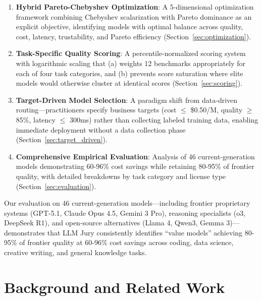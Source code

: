 \documentclass[11pt,a4paper]{article}
\begin{document}
\begin{enumerate}
    \item \textbf{Hybrid Pareto-Chebyshev Optimization}: A 5-dimensional optimization framework combining Chebyshev scalarization with Pareto dominance as an explicit objective, identifying models with optimal balance across quality, cost, latency, trustability, and Pareto efficiency (Section~\ref{sec:optimization}).
    
    \item \textbf{Task-Specific Quality Scoring}: A percentile-normalized scoring system with logarithmic scaling that (a) weights 12 benchmarks appropriately for each of four task categories, and (b) prevents score saturation where elite models would otherwise cluster at identical scores (Section~\ref{sec:scoring}).
    
    \item \textbf{Target-Driven Model Selection}: A paradigm shift from data-driven routing---practitioners specify business targets (cost $\leq$ \$0.50/M, quality $\geq$ 85\%, latency $\leq$ 300ms) rather than collecting labeled training data, enabling immediate deployment without a data collection phase (Section~\ref{sec:target_driven}).
    
    \item \textbf{Comprehensive Empirical Evaluation}: Analysis of 46 current-generation models demonstrating 60-96\% cost savings while retaining 80-95\% of frontier quality, with detailed breakdowns by task category and license type (Section~\ref{sec:evaluation}).
\end{enumerate}

Our evaluation on 46 current-generation models---including frontier proprietary systems (GPT-5.1, Claude Opus 4.5, Gemini 3 Pro), reasoning specialists (o3, DeepSeek R1), and open-source alternatives (Llama 4, Qwen3, Gemma 3)---demonstrates that LLM Jury consistently identifies ``value models'' achieving 80-95\% of frontier quality at 60-96\% cost savings across coding, data science, creative writing, and general knowledge tasks.



\section{Background and Related Work}
\end{document}
